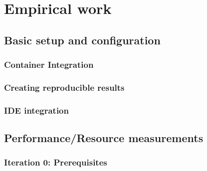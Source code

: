 \chapter{Empirical work}
\label{ch:empirical_work}

\section{Basic setup and configuration}

\subsection{Container Integration}

\subsection{Creating reproducible results}

\subsection{IDE integration}

\section{Performance/Resource measurements}
\subsection{Iteration 0: Prerequisites}






